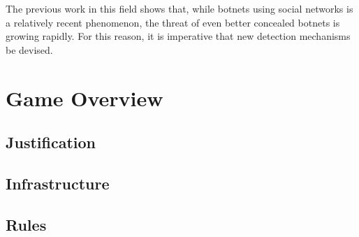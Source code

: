 \documentclass[11pt, oneside]{article} %
\numberwithin{equation}{section} %
\numberwithin{figure}{section} %
\numberwithin{table}{section} %
\begin{document}
The previous work in this field shows that, while botnets using social networks is a relatively recent phenomenon, the threat of even better concealed botnets is growing rapidly.  For this reason, it is imperative that new detection mechanisms be devised.

\section{Game Overview}
	\subsection{Justification}
	\subsection{Infrastructure}
	\subsection{Rules}




	
\end{document}
